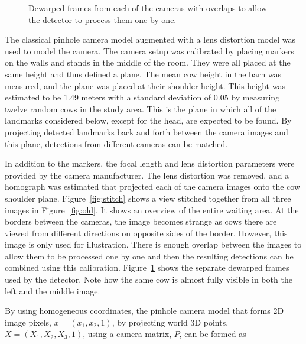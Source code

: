 \documentclass{IET}
\begin{document}
\begin{figure}[b]
\begin{center}
\end{center}
  \caption{Dewarped frames from each of the cameras with overlaps to allow the detector to process them one by one.}
  \label{fig:separate}
\end{figure}



The classical pinhole camera model augmented with a lens distortion model was used to model the camera.
The camera setup was calibrated by placing markers on the walls and stands in the middle of the room. They were all placed at the same height and thus defined a plane. The mean cow height in the barn was measured, and the plane was placed at their shoulder height. This height was estimated to be 1.49 meters with a standard deviation of 0.05 by measuring twelve random cows in the study area.
This is the plane in which all of the landmarks considered below, except for the head, are expected to be found. By projecting detected landmarks back and forth between the camera images and this plane, detections from different cameras can be matched.

In addition to the markers, the focal length and lens distortion parameters were provided by the camera manufacturer.
The lens distortion was removed, and a homograph was estimated that projected each of the camera images onto the cow shoulder plane. Figure~\ref{fig:stitch} shows a view stitched together from all three images in Figure~\ref{fig:old}. It shows an overview of the entire waiting area. At the borders between the cameras, the image becomes strange as cows there are viewed from different directions on opposite sides of the border. However, this image is only used for illustration. There is enough overlap between the images to allow them to be processed one by one and then the resulting detections can be combined using this calibration. Figure~\ref{fig:separate} shows the separate dewarped frames used by the detector. Note how the same cow is almost fully visible in both the left and the middle image.

By using homogeneous coordinates, the pinhole camera model that forms 2D image pixels, $x=\left(x_1, x_2, 1\right)$, by projecting world 3D points, $X=\left(X_1, X_2, X_3, 1\right)$, using a camera matrix, $P$, can be formed as
\end{document}
